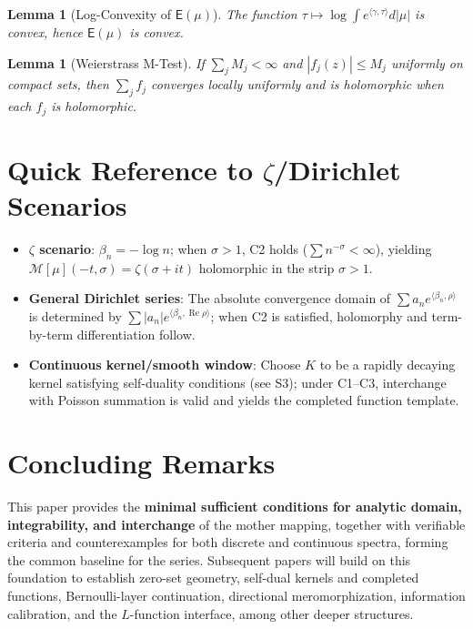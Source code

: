 \documentclass[11pt,a4paper]{article}
\newtheorem{lemma}[theorem]{Lemma}
\theoremstyle{remark}
\DeclareMathOperator{\Re}{Re}
\begin{document}
\begin{lemma}[Log-Convexity of $\mathsf{E}(\mu)$]\label{lem:logconvex}
The function $\tau\mapsto \log \int e^{\langle\gamma,\tau\rangle}d|\mu|$ is convex, hence $\mathsf{E}(\mu)$ is convex.
\end{lemma}

\begin{lemma}[Weierstrass M-Test]\label{lem:weierstrass}
If $\sum_j M_j<\infty$ and $|f_j(z)|\le M_j$ uniformly on compact sets, then $\sum_j f_j$ converges locally uniformly and is holomorphic when each $f_j$ is holomorphic.
\end{lemma}

\section{Quick Reference to $\zeta$/Dirichlet Scenarios}

\begin{itemize}
\item \textbf{$\zeta$ scenario}: $\beta_n=-\log n$; when $\sigma>1$, C2 holds ($\sum n^{-\sigma}<\infty$), yielding $\mathcal{M}[\mu](-t,\sigma)=\zeta(\sigma+it)$ holomorphic in the strip $\sigma>1$.
\item \textbf{General Dirichlet series}: The absolute convergence domain of $\sum a_n e^{\langle\beta_n,\rho\rangle}$ is determined by $\sum |a_n|e^{\langle\beta_n,\Re\rho\rangle}$; when C2 is satisfied, holomorphy and term-by-term differentiation follow.
\item \textbf{Continuous kernel/smooth window}: Choose $K$ to be a rapidly decaying kernel satisfying self-duality conditions (see S3); under C1--C3, interchange with Poisson summation is valid and yields the completed function template.
\end{itemize}

\section*{Concluding Remarks}

This paper provides the \textbf{minimal sufficient conditions for analytic domain, integrability, and interchange} of the mother mapping, together with verifiable criteria and counterexamples for both discrete and continuous spectra, forming the common baseline for the series. Subsequent papers will build on this foundation to establish zero-set geometry, self-dual kernels and completed functions, Bernoulli-layer continuation, directional meromorphization, information calibration, and the $L$-function interface, among other deeper structures.
\end{document}
